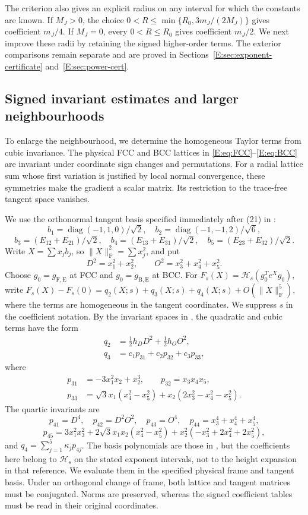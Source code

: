 \documentclass[reqno,english]{amsart}
\theoremstyle{definition}
\newtheorem{open problem}[theorem]{Open Problem}
\theoremstyle{remark}
\theoremstyle{plain}
\numberwithin{equation}{section}
\newcommand{\HH}{\mathcal H}
\newcommand{\diag}{\operatorname{diag}}
\newcommand{\norm}[1]{\lVert#1\rVert_{\mathrm F}}
\newcommand{\gFE}{g_{\mathrm F,\mathrm E}}
\newcommand{\gBE}{g_{\mathrm B,\mathrm E}}
\begin{document}
The criterion also gives an explicit radius on any interval for
which the constants are known. If $M_J>0$, the choice
$0<R\le\min\{R_0,3m_J/(2M_J)\}$ gives coefficient $m_J/4$.
If $M_J=0$, every $0<R\le R_0$ gives coefficient $m_J/2$.
We next improve these radii by retaining the signed higher-order
terms. The exterior comparisons remain separate and are proved in
Sections~\ref{E:sec:exponent-certificate} and~\ref{E:sec:power-cert}.

\subsection{Signed invariant estimates and larger neighbourhoods}\label{E:sec:local2}\label{app:invariants}
To enlarge the neighbourhood, we determine the homogeneous Taylor
terms from cubic invariance. The physical FCC and BCC lattices in
\eqref{E:eq:FCC}--\eqref{E:eq:BCC} are invariant under coordinate
sign changes and permutations. For a radial lattice sum whose first
variation is justified by local normal convergence, these symmetries
make the gradient a scalar matrix. Its restriction to the trace-free
tangent space vanishes.

We use the orthonormal tangent basis specified immediately after (21)
in \cite[Section~3, pp.~13--14]{SS}:
\[
 b_1=\diag(-1,1,0)/\sqrt2,\quad
 b_2=\diag(-1,-1,2)/\sqrt6,
\]
\[
 b_3=(E_{12}+E_{21})/\sqrt2,\quad
 b_4=(E_{13}+E_{31})/\sqrt2,\quad
 b_5=(E_{23}+E_{32})/\sqrt2.
\]
Write $X=\sum x_jb_j$, so $\norm X^2=\sum x_j^2$, and put
\[
 D^2=x_1^2+x_2^2,\qquad O^2=x_3^2+x_4^2+x_5^2.
\]
Choose $g_0=\gFE$ at FCC and $g_0=\gBE$ at BCC. For
$F_s(X)=\HH_s(g_0^Te^Xg_0)$, write
$F_s(X)-F_s(0)=q_2(X;s)+q_3(X;s)+q_4(X;s)+O(\norm X^5)$,
where the terms are homogeneous in the tangent coordinates. We suppress
$s$ in the coefficient notation. By the invariant spaces in
\cite[Section~3, (21)]{SS}, the quadratic and cubic terms have the
form
\begin{align}
 q_2&=\tfrac12h_DD^2+\tfrac12h_OO^2,\\
 q_3&=c_1p_{31}+c_2p_{32}+c_3p_{33},
 \label{E:eq:low-invariants}
\end{align}
where
\begin{align*}
 p_{31}&=-3x_1^2x_2+x_2^3,\qquad p_{32}=x_3x_4x_5,\\
 p_{33}&=\sqrt3x_1(x_4^2-x_5^2)+x_2(2x_3^2-x_4^2-x_5^2).
\end{align*}
The quartic invariants are
\[
 p_{41}=D^4,\quad p_{42}=D^2O^2,\quad p_{43}=O^4,\quad
 p_{44}=x_3^4+x_4^4+x_5^4,
\]
\[
 p_{45}=3x_1^2x_3^2+2\sqrt3x_1x_2(x_4^2-x_5^2)
       +x_2^2(-x_3^2+2x_4^2+2x_5^2),
\]
and $q_4=\sum_{j=1}^5\kappa_jp_{4j}$. The basis polynomials are
those in \cite[(21)]{SS}, but the coefficients here belong to
$\HH_s$ on the stated exponent intervals, not to the height
expansion in that reference. We evaluate them in the specified
physical frame and tangent basis. Under an orthogonal change of frame,
both lattice and tangent matrices must be conjugated. Norms are
preserved, whereas the signed coefficient tables must be read in
their original coordinates.
\end{document}
